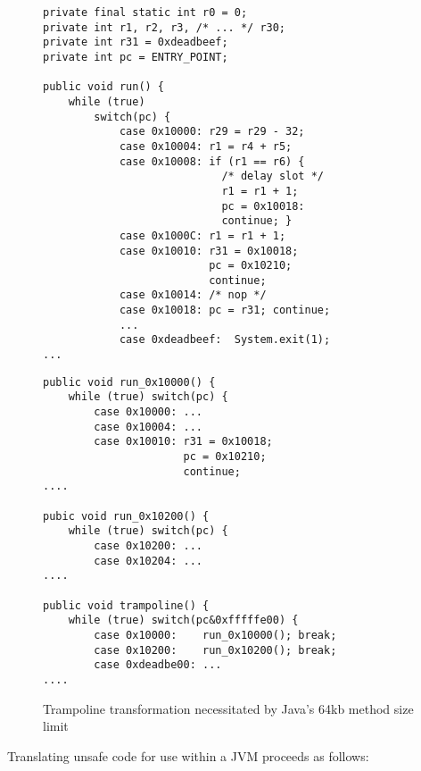 \documentclass{acmconf}
\begin{document}
\begin{figure*}[t]
\begin{minipage}[c]{7in}%
\begin{multicols}{2}
{\footnotesize\begin{verbatim}
private final static int r0 = 0;
private int r1, r2, r3, /* ... */ r30;
private int r31 = 0xdeadbeef;
private int pc = ENTRY_POINT;

public void run() {
    while (true)
        switch(pc) {
            case 0x10000: r29 = r29 - 32;
            case 0x10004: r1 = r4 + r5;
            case 0x10008: if (r1 == r6) {
                            /* delay slot */
                            r1 = r1 + 1;
                            pc = 0x10018:
                            continue; }
            case 0x1000C: r1 = r1 + 1;
            case 0x10010: r31 = 0x10018;
                          pc = 0x10210;
                          continue;
            case 0x10014: /* nop */
            case 0x10018: pc = r31; continue;
            ...
            case 0xdeadbeef:  System.exit(1);
...
\end{verbatim}}
\vspace{1in}
{\footnotesize\begin{verbatim}
public void run_0x10000() {
    while (true) switch(pc) {
        case 0x10000: ...
        case 0x10004: ...
        case 0x10010: r31 = 0x10018;
                      pc = 0x10210;
                      continue;
....

pubic void run_0x10200() {
    while (true) switch(pc) {
        case 0x10200: ...
        case 0x10204: ...
....

public void trampoline() {
    while (true) switch(pc&0xfffffe00) {
        case 0x10000:    run_0x10000(); break;
        case 0x10200:    run_0x10200(); break;
        case 0xdeadbe00: ...
....
\end{verbatim}}
\end{multicols}
\end{minipage}
\caption{\label{code1} Trampoline transformation necessitated by Java's 64kb method size limit}
\end{figure*}

Translating unsafe code for use within a JVM proceeds as follows:
\end{document}
